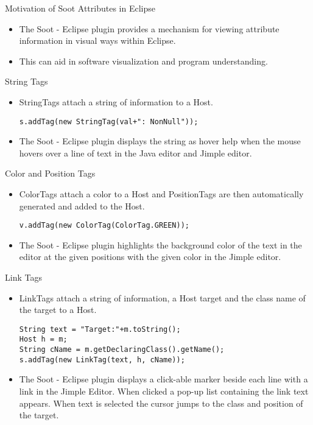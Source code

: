 \begin{slide}{Motivation of Soot Attributes in Eclipse}
\begin{itemize}
\item The Soot - Eclipse plugin provides a mechanism for viewing
attribute information in visual ways within Eclipse.
\item This can aid in software visualization and program understanding.
\end{itemize}
\end{slide}

\begin{slide}{String Tags}
\begin{itemize}
\item {\red StringTag}s attach a string of information to a {\red Host}.
{\tiny
\begin{verbatim}
s.addTag(new StringTag(val+": NonNull"));
\end{verbatim}
}
\item The Soot - Eclipse plugin displays the string as hover help when the mouse hovers over a line of text in the Java editor and Jimple editor.
\end{itemize}
\end{slide}

\begin{slide}{Color and Position Tags}
\begin{itemize}
\item {\red ColorTag}s attach a color to a {\red Host} and {\red PositionTag}s are then automatically generated and added to the {\red Host}.
{\tiny
\begin{verbatim}
v.addTag(new ColorTag(ColorTag.GREEN));
\end{verbatim}
}
\item The Soot - Eclipse plugin highlights the background color of the text in the editor at the given positions with the given color in the Jimple editor.
\end{itemize}
\end{slide}

\begin{slide}{Link Tags}
\begin{itemize}
\item {\red LinkTag}s attach a string of information, a {\red Host} target and the class name of the target to a {\red Host}.
{\tiny
\begin{verbatim}
String text = "Target:"+m.toString();
Host h = m;
String cName = m.getDeclaringClass().getName();
s.addTag(new LinkTag(text, h, cName));
\end{verbatim}
}
\item The Soot - Eclipse plugin displays a click-able marker beside each line with a link in the Jimple Editor. When clicked a pop-up list containing the link text appears. When text is selected the cursor jumps to the class and position of the target.
\end{itemize}
\end{slide}

